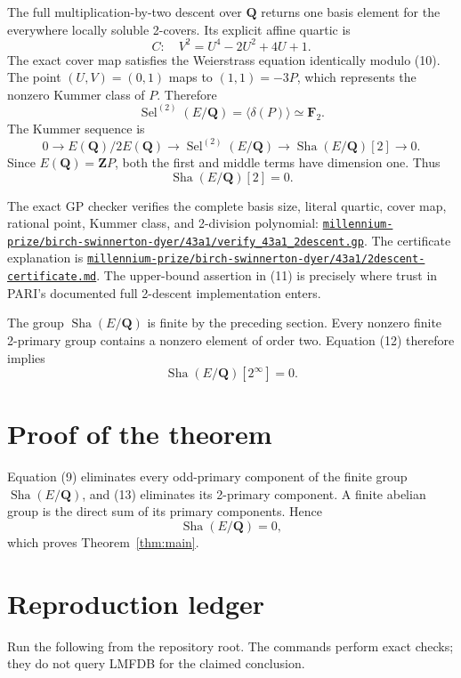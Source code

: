\documentclass[11pt]{article}
\newcommand{\Q}{\mathbf Q}
\newcommand{\F}{\mathbf F}
\newcommand{\Z}{\mathbf Z}
\newcommand{\Sel}{\operatorname{Sel}}
\newcommand{\Sha}{\mathop{\mathrm{Sha}}}
\newcommand{\artifact}[1]{\href{run:../#1}{\nolinkurl{#1}}}
\begin{document}
The full multiplication-by-two descent over \(\Q\) returns one basis element
for the everywhere locally soluble 2-covers.  Its explicit affine quartic is
\[
 C:\quad V^2=U^4-2U^2+4U+1.                            \tag{10}
\]
The exact cover map satisfies the Weierstrass equation identically modulo
(10).  The point \((U,V)=(0,1)\) maps to \((1,1)=-3P\), which represents the
nonzero Kummer class of \(P\).  Therefore
\[
 \Sel^{(2)}(E/\Q)=\langle\delta(P)\rangle\simeq\F_2.   \tag{11}
\]
The Kummer sequence is
\[
 0\longrightarrow E(\Q)/2E(\Q)
 \longrightarrow\Sel^{(2)}(E/\Q)
 \longrightarrow\Sha(E/\Q)[2]
 \longrightarrow0.
\]
Since \(E(\Q)=\Z P\), both the first and middle terms have dimension one.
Thus
\begin{equation}
 \Sha(E/\Q)[2]=0.                                      \tag{12}
\end{equation}

The exact GP checker verifies the complete basis size, literal quartic, cover
map, rational point, Kummer class, and 2-division polynomial:
\artifact{millennium-prize/birch-swinnerton-dyer/43a1/verify_43a1_2descent.gp}.
The certificate explanation is
\artifact{millennium-prize/birch-swinnerton-dyer/43a1/2descent-certificate.md}.
The upper-bound assertion in (11) is precisely where trust in PARI's
documented full 2-descent implementation enters.

The group \(\Sha(E/\Q)\) is finite by the preceding section.  Every nonzero
finite 2-primary group contains a nonzero element of order two.  Equation (12)
therefore implies
\begin{equation}
 \Sha(E/\Q)[2^\infty]=0.                               \tag{13}
\end{equation}

\section{Proof of the theorem}

Equation (9) eliminates every odd-primary component of the finite group
\(\Sha(E/\Q)\), and (13) eliminates its 2-primary component.  A finite abelian
group is the direct sum of its primary components.  Hence
\[
 \Sha(E/\Q)=0,
\]
which proves Theorem~\ref{thm:main}.

\section{Reproduction ledger}

Run the following from the repository root.  The commands perform exact
checks; they do not query LMFDB for the claimed conclusion.
\end{document}
